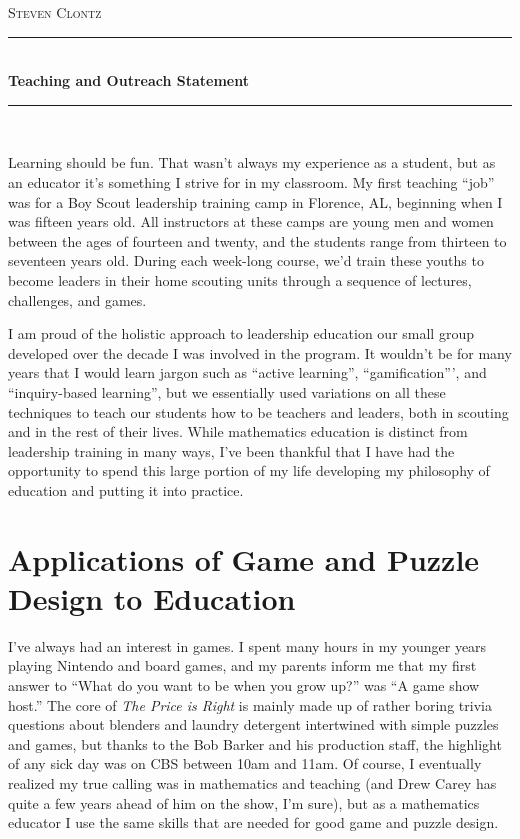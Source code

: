 \documentclass[11pt]{amsart}
\theoremstyle{plain}
\newcommand{\HRule}{\rule{\linewidth}{0.5mm}}
\newcommand{\<}{\langle}
\renewcommand{\>}{\rangle}
\begin{document}
\begin{center}

\textsc{\huge Steven Clontz}

\HRule \\[0.1cm]
{ \huge \bfseries Teaching and Outreach Statement \\[0.4cm] }

\HRule \\[1.5cm]

\end{center}

Learning should be fun. That wasn't always my experience as a student, but
as an educator it's something I strive for in my classroom.
My first teaching ``job'' was
for a Boy Scout leadership training camp in Florence, AL, beginning when I was
fifteen years old. All instructors at these camps are young men and women
between the ages of fourteen and twenty, and the students range from thirteen to
seventeen years old. During each week-long course, we'd train these youths to
become leaders in their home scouting units through a sequence of lectures,
challenges, and games.

I am proud of the holistic approach to leadership education our small
group developed over the decade I was involved in the program. It wouldn't be
for many years that I would learn jargon such as ``active learning'',
``gamification''', and ``inquiry-based learning'', but we essentially used
variations on all these techniques to teach our students how to be teachers
and leaders, both in scouting and in the rest of their lives.
While mathematics education is distinct from leadership training in many ways,
I've been thankful that I have had the opportunity to spend this large portion
of my life developing my philosophy of education and putting it into practice.


\section*{Applications of Game and Puzzle Design to Education}

I've always had an interest in games. I spent many hours in my younger years
playing Nintendo and board games, and my parents inform me that my first
answer to ``What do you want to be when you grow up?'' was ``A game show host.''
The core of \textit{The Price is Right} is mainly made up of
rather boring trivia questions about blenders and laundry detergent
intertwined with simple puzzles and games, but
thanks to the Bob Barker and his production staff, the highlight of any
sick day was on CBS between 10am and 11am.
Of course, I eventually realized my true calling was in mathematics and
teaching (and Drew Carey has quite a few years ahead of him on the show,
I'm sure), but as a mathematics educator I use the same skills that
are needed for good game and puzzle design.
\end{document}
